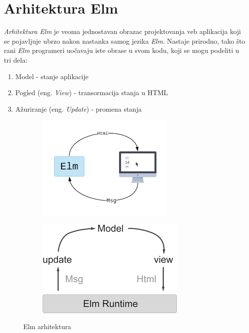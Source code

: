 \documentclass[12pt,oneside]{memoir}
\begin{document}
\section{Arhitektura Elm}
\emph{Arhitektura Elm} je veoma jednostavan obrazac projektovanja veb aplikacija koji se pojavljuje
ubrzo nakon nastanka samog jezika \emph{Elm}. Nastaje prirodno, tako što rani \emph{Elm} programeri uočavaju
iste obrase u svom kodu, koji se mogu podeliti u tri dela:
\begin{enumerate}
  \item Model - stanje aplikacije
  \item Pogled (eng. \emph{View}) - transormacija stanja u HTML
  \item Ažuriranje (eng. \emph{Update}) - promena stanja
\end{enumerate}
\begin{figure}[!ht]
\centering
\begin{subfigure}{.5\textwidth}
  \centering
  \includegraphics[width=.8\linewidth]{elm-arch-site}
\end{subfigure}%
\begin{subfigure}{.5\textwidth}
  \centering
  \includegraphics[width=.7\linewidth]{elm-arch-book}
\end{subfigure}
\caption{Elm arhitektura}
\label{fig:elm-arh}
\end{figure}
\end{document}
